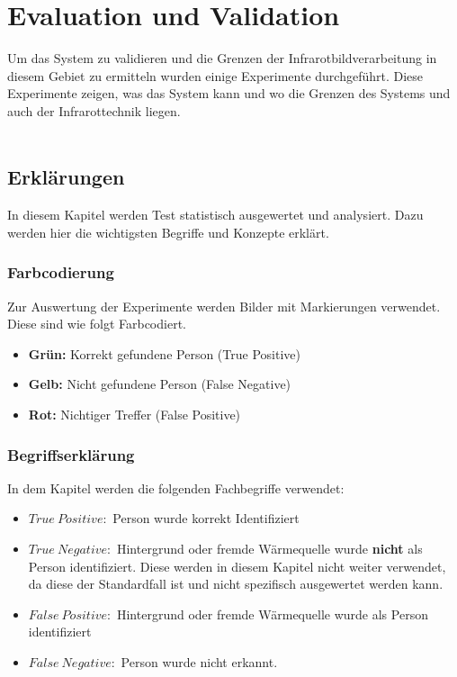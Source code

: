 \chapter{Evaluation und Validation}
\label{ch:Eval}

Um das System zu validieren und die Grenzen der Infrarotbildverarbeitung in diesem Gebiet zu ermitteln wurden einige Experimente durchgeführt. Diese Experimente zeigen, was das System kann und wo die Grenzen des Systems und auch der Infrarottechnik liegen.\\
\\
\section{Erklärungen}
\label{sec:explanation}
In diesem Kapitel werden Test statistisch ausgewertet und analysiert. Dazu werden hier die wichtigsten Begriffe und Konzepte erklärt.

\subsection{Farbcodierung}
Zur Auswertung der Experimente werden Bilder mit Markierungen verwendet. Diese sind wie folgt Farbcodiert.\\

\begin{itemize}
	\item \textbf{Grün:} Korrekt gefundene Person (True Positive)
	\item \textbf{Gelb:} Nicht gefundene Person (False Negative)
	\item \textbf{Rot:} Nichtiger Treffer (False Positive)
\end{itemize}
\vspace{1em}

\subsection{Begriffserklärung}
\noindent In dem Kapitel werden die folgenden Fachbegriffe verwendet:
\begin{itemize}
	\item $True\: Positive:$   Person wurde korrekt Identifiziert
	\item $True\: Negative:$   Hintergrund oder fremde Wärmequelle wurde \textbf{nicht} als Person identifiziert. Diese werden in diesem Kapitel nicht weiter verwendet, da diese der Standardfall ist und nicht spezifisch ausgewertet werden kann.
	\item $False\: Positive:$  Hintergrund oder fremde Wärmequelle wurde als Person identifiziert
	\item $False\: Negative:$  Person wurde nicht erkannt.
\end{itemize}
\vspace{1em}

